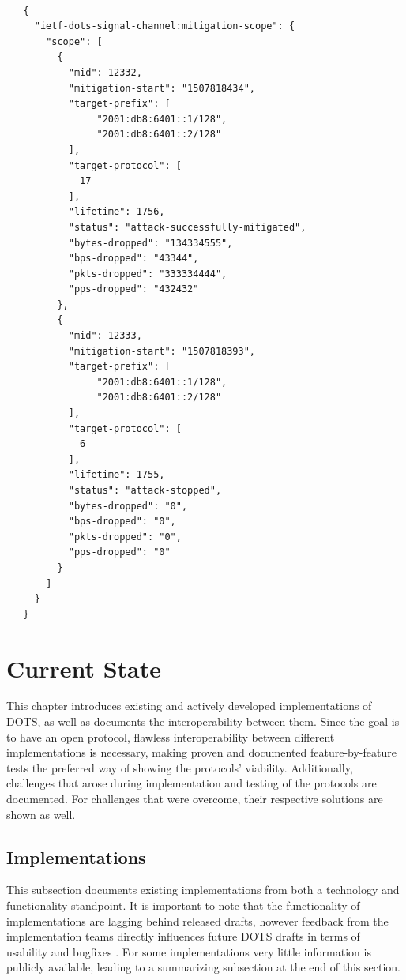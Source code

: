 \begin{verbatim}
    
   {
     "ietf-dots-signal-channel:mitigation-scope": {
       "scope": [
         {
           "mid": 12332,
           "mitigation-start": "1507818434",
           "target-prefix": [
                "2001:db8:6401::1/128",
                "2001:db8:6401::2/128"
           ],
           "target-protocol": [
             17
           ],
           "lifetime": 1756,
           "status": "attack-successfully-mitigated",
           "bytes-dropped": "134334555",
           "bps-dropped": "43344",
           "pkts-dropped": "333334444",
           "pps-dropped": "432432"
         },
         {
           "mid": 12333,
           "mitigation-start": "1507818393",
           "target-prefix": [
                "2001:db8:6401::1/128",
                "2001:db8:6401::2/128"
           ],
           "target-protocol": [
             6
           ],
           "lifetime": 1755,
           "status": "attack-stopped",
           "bytes-dropped": "0",
           "bps-dropped": "0",
           "pkts-dropped": "0",
           "pps-dropped": "0"
         }
       ]
     }
   }
\end{verbatim}{}
\fi


\section{Current State}

This chapter introduces existing and actively developed implementations of DOTS, as well as documents the interoperability between them. Since the goal is to have an open protocol, flawless interoperability between different implementations is necessary, making proven and documented feature-by-feature tests the preferred way of showing the protocols' viability. Additionally, challenges that arose during implementation and testing of the protocols are documented. For challenges that were overcome, their respective solutions are shown as well.

\subsection{Implementations}
This subsection documents existing implementations from both a technology and functionality standpoint. It is important to note that the functionality of implementations are lagging behind released drafts, however feedback from the implementation teams directly influences future DOTS drafts in terms of usability and bugfixes \cite{interop-100}. For some implementations very little information is publicly available, leading to a summarizing subsection at the end of this section.


